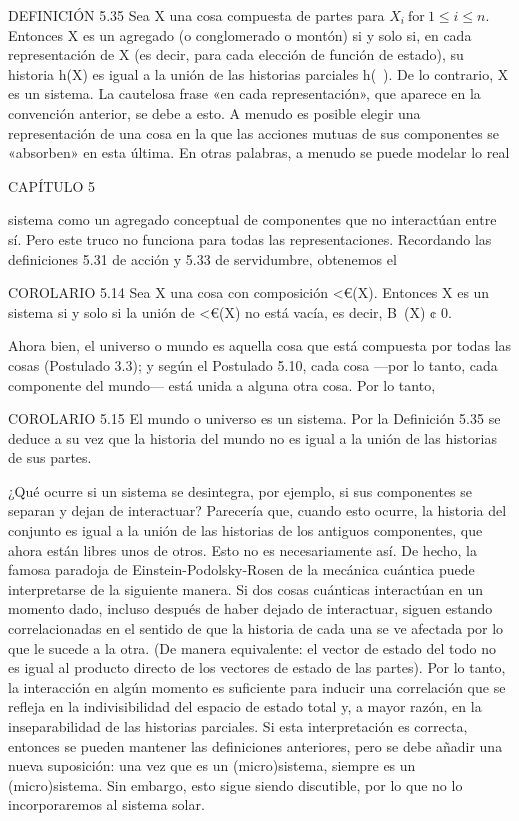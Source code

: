 \begin{justifying}
    DEFINICIÓN 5.35 Sea X una cosa compuesta de partes para $X_{i} \ \text{for} \ 1 \le i \le n$.
    Entonces X es un agregado (o conglomerado o montón) si y solo si, en cada representación de X (es decir, para cada elección de función de estado), su historia h(X)
    es igual a la unión de las historias parciales h(~). De lo contrario, X es un sistema.
    La cautelosa frase «en cada representación», que aparece en la convención anterior, se debe a esto. A menudo es posible elegir una
    representación de una cosa en la que las acciones mutuas de sus componentes
    se «absorben» en esta última. En otras palabras, a menudo se puede modelar lo real

    \pagebreak

    \begin{center}
        CAPÍTULO 5
    \end{center}

    sistema como un agregado conceptual de componentes que no interactúan entre sí. Pero
    este truco no funciona para todas las representaciones.
    Recordando las definiciones 5.31 de acción y 5.33 de servidumbre, obtenemos el

    COROLARIO 5.14 Sea X una cosa con composición <€(X). Entonces X es un
    sistema si y solo si la unión de <€(X) no está vacía, es decir, B~(X) ¢ 0.

    Ahora bien, el universo o mundo es aquella cosa que está compuesta por todas las
    cosas (Postulado 3.3); y según el Postulado 5.10, cada cosa —por lo tanto, cada
    componente del mundo— está unida a alguna otra cosa. Por lo tanto, 

    COROLARIO 5.15 El mundo o universo es un sistema.
    Por la Definición 5.35 se deduce a su vez que la historia del mundo no es
    igual a la unión de las historias de sus partes.

    ¿Qué ocurre si un sistema se desintegra, por ejemplo, si sus componentes se separan
    y dejan de interactuar? Parecería que, cuando esto ocurre, la historia
    del conjunto es igual a la unión de las historias de los antiguos
    componentes, que ahora están libres unos de otros. Esto no es necesariamente así. De hecho, la famosa paradoja de Einstein-Podolsky-Rosen de la mecánica cuántica puede interpretarse de la siguiente manera. Si dos cosas cuánticas
    interactúan en un momento dado, incluso después de haber dejado de interactuar,
    siguen estando correlacionadas en el sentido de que la historia de cada una se ve afectada por
    lo que le sucede a la otra. (De manera equivalente: el vector de estado del todo
    no es igual al producto directo de los vectores de estado de las partes). Por lo tanto,
    la interacción en algún momento es suficiente para inducir una correlación que se
    refleja en la indivisibilidad del espacio de estado total y, a
    mayor razón, en la inseparabilidad de las historias parciales. Si esta interpretación es correcta, entonces se pueden mantener las definiciones anteriores, pero se debe añadir una nueva
    suposición: una vez que es un (micro)sistema, siempre es un (micro)sistema. Sin embargo, esto sigue siendo discutible, por lo que no lo incorporaremos al
    sistema solar.


\end{justifying}
